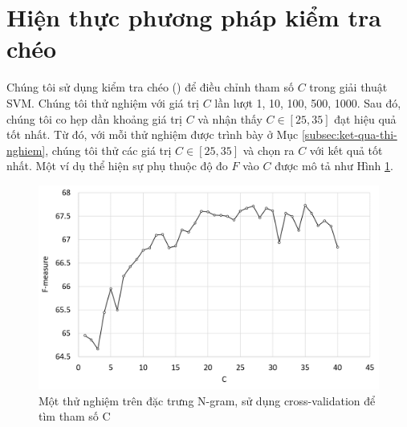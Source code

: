 \section{Hiện thực phương pháp kiểm tra chéo}
Chúng tôi sử dụng kiểm tra chéo () để điều chỉnh tham số $C$ trong giải thuật SVM. Chúng tôi thử nghiệm với giá trị $C$ lần lượt 1, 10, 100, 500, 1000. Sau đó, chúng tôi co hẹp dần khoảng giá trị $C$ và nhận thấy $C \in [25, 35]$ đạt hiệu quả tốt nhất. Từ đó, với mỗi thử nghiệm được trình bày ở Mục \ref{subsec:ket-qua-thi-nghiem}, chúng tôi thử các giá trị $C \in [25, 35]$ và chọn ra $C$ với kết quả tốt nhất. Một ví dụ thể hiện sự phụ thuộc độ đo $F$ vào $C$ được mô tả như Hình \ref{fig:hien-thuc-cross}.
\begin{figure}[h]
\centering
\includegraphics[scale=0.34]{../hinh/hien_thuc_cross.png}
\caption{Một thử nghiệm trên đặc trưng N-gram, sử dụng cross-validation để tìm tham số C}
\label{fig:hien-thuc-cross}
\end{figure}